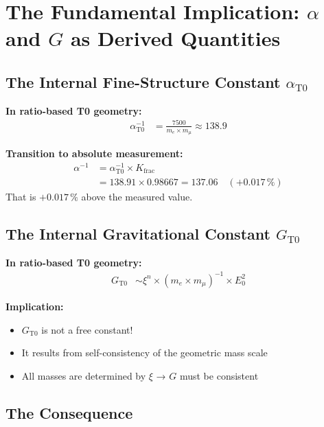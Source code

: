 	\section{The Fundamental Implication: $\alpha$ and $G$ as Derived Quantities}
	
	\subsection{The Internal Fine-Structure Constant $\alpha_{\text{T0}}$}
	
	\textbf{In ratio-based T0 geometry:}
	\begin{align*}
		\alpha_{\text{T0}}^{-1} &= \frac{7500}{m_e \times m_μ} \approx 138.9
	\end{align*}
	
	\textbf{Transition to absolute measurement:}
	\begin{align*}
		\alpha^{-1} &= \alpha_{\text{T0}}^{-1} \times K_{\text{frac}} \\
		&= 138.91 \times 0.98667 = 137.06 \quad (+0.017\,\%)
	\end{align*}
	That is $+0.017\,\%$ above the measured value.
	
	\subsection{The Internal Gravitational Constant $G_{\text{T0}}$}
	
	\textbf{In ratio-based T0 geometry:}
	\begin{align*}
		G_{\text{T0}} &\sim \xi^n \times (m_e \times m_μ)^{-1} \times E_0^2
	\end{align*}
	
	\textbf{Implication:}
	\begin{itemize}
		\item $G_{\text{T0}}$ is not a free constant!
		\item It results from self-consistency of the geometric mass scale
		\item All masses are determined by $\xi$ → $G$ must be consistent
	\end{itemize}
	
	\subsection{The Consequence}
	
	\begin{center}
	\end{center}
	

